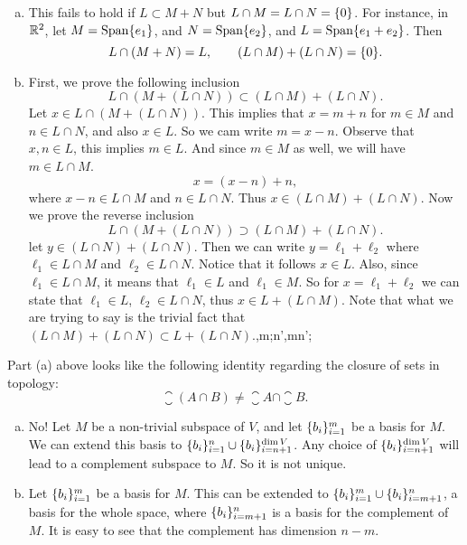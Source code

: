 \begin{problem}
	\begin{solution}
		\begin{enumerate}[(a)]
			\item This fails to hold if $ L \subset M + N $ but $ L\cap M = L \cap N = \{0\} $. For instance, in $ \mathbb{R}^2 $, let $ M = \operatorname{Span}\{e_1\} $, and $ N = \operatorname{Span}\{e_2\} $, and $ L = \operatorname{Span}\{e_1+e_2\} $. Then 
			\[ L\cap (M+N) = L, \qquad (L\cap M) + (L\cap N) = \{0\}. \] 
			
			\item First, we prove the following inclusion
			\[ L \cap (M + (L\cap N)) \subset (L\cap M) + (L \cap N). \]
			Let $ x \in L \cap (M+(L\cap N)) $. This implies that $ x = m+n $ for $ m \in M $ and $ n \in L\cap N $, and also $ x\in L $. So we cam write $ m = x-n $. Observe that $ x,n \in L $, this implies $ m \in L $. And since $ m\in M $ as well, we will have $ m\in L\cap M $.
			\[ x = (x-n) + n, \]
			where $ x-n \in L\cap M $ and $ n \in L\cap N $. Thus $ x \in (L\cap M) + (L\cap N) $. Now we prove the reverse inclusion
			\[ L \cap (M + (L\cap N)) \supset (L\cap M) + (L \cap N). \]
			let $ y \in (L\cap N) + (L\cap N) $. Then we can write $ y = \ell_1 + \ell_2 $ where $ \ell_1 \in L\cap M $ and $ \ell_2 \in L\cap N $. Notice that it follows $ x \in L $. Also, since $ \ell_1 \in L\cap M $, it means that $ \ell_1 \in L $ and $ \ell_1 \in M $. So for $ x = \ell_1 + \ell_2 $ we can state that $ \ell_1 \in L $, $ \ell_2 \in L\cap N  $, thus $ x \in L + (L\cap M) $. Note that what we are trying to say is the trivial fact that $ (L\cap M) + (L\cap N) \subset L + (L\cap N) $.,m;n',mn';
		\end{enumerate}
	\end{solution}
	\begin{remark}
		Part (a) above looks like the following identity regarding the closure of sets in topology:
		\[ \closure{(A\cap B)} \neq \closure{A} \cap \closure{B}. \]
	\end{remark}
\end{problem}

\begin{problem}
	\begin{solution}
		\begin{enumerate}[(a)]
			\item No! Let $ M $ be a non-trivial subspace of $ V $, and let $ \{b_i\}_{i=1}^m $ be a basis for $ M $. We can extend this basis to $ \{b_i\}_{i=1}^n \cup \{b_i\}_{i=n+1}^{\dim V} $. Any choice of $ \{b_i\}_{i=n+1}^{\dim V} $ will lead to a complement subspace to $ M $. So it is not unique.
			
			\item Let $ \{b_i\}_{i=1}^m $ be a basis for $ M $. This can be extended to $ \{b_i\}_{i=1}^m \cup \{b_i\}_{i=m+1}^n $, a basis for the whole space, where $ \{b_i\}_{i=m+1}^n $ is a basis for the complement of $ M $. It is easy to see that the complement has dimension $ n-m $.
		\end{enumerate}
	\end{solution}
\end{problem}


